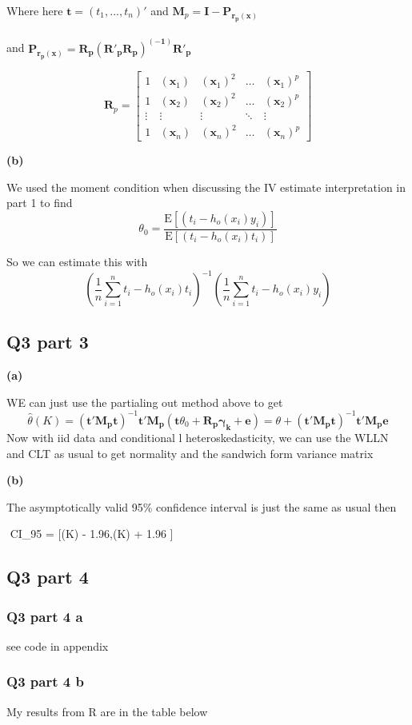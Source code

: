 \documentclass[11pt]{article}
\newcommand{\E}{\mathrm{E}}
\begin{document}
Where here $\bm{t} = (t_1,..., t_n)'$ and 
$\bm{M}_p = \bm{I - P_{r_p(x)}}$ \\ \\
and $ \bm{P_{r_p(x)}} = \bm{R_p(R'_pR_p)^{(-1)}R'_p} $

$$
\bm{R}_p = 
\begin{bmatrix}
	1 & (\bm{x}_1) & (\bm{x}_1)^2 & \dots& (\bm{x}_1)^p \\
	1 & (\bm{x}_2) & (\bm{x}_2)^2 & \dots& (\bm{x}_2)^p\\
	\vdots & \vdots & \vdots & \ddots & \vdots \\
	1 & (\bm{x}_n) & (\bm{x}_n)^2 & \dots& (\bm{x}_n)^p
\end{bmatrix}
$$

\textbf{(b)}

We used the moment condition when discussing the IV estimate interpretation in part 1 to find
$$\theta_0= \frac{\E[(t_i - h_o(x_i)y_i )] }{\E[(t_i - h_o(x_i)t_i)]}$$

So we can estimate this with 
$$\left(\frac{1}{n} \sum_{i=1}^{n}t_i - h_o(x_i)t_i \right)^{-1}\left(\frac{1}{n} \sum_{i=1}^{n}t_i - h_o(x_i)y_i \right) $$

\subsection{Q3 part 3}
\textbf{(a)}

WE can just use the partialing out method above to get 
$$\hat{\theta}(K) = (\bm{t'M_pt})^{-1}\bm{t'M_p}(\bm{t} \theta_0 + \bm{R_p \gamma_k} + \bm{e}) = \theta + (\bm{t'M_pt})^{-1} \bm{t'M_pe}$$
Now with iid data and conditional l heteroskedasticity, we can use the WLLN and CLT as usual to get normality and the sandwich form variance matrix 

\textbf{(b)}

The asymptotically valid 95\% confidence interval is just the same as usual then

$$ CI_{95} = [\hat{\theta}(K) - 1.96,\hat{\theta}(K) + 1.96 ]
 

\subsection{Q3 part 4}
\subsubsection{Q3 part 4 a}
see code in appendix 
\subsubsection{Q3 part 4 b}

My results from R are in the table below 

\begin{center}
	
\end{center}


\end{document}
